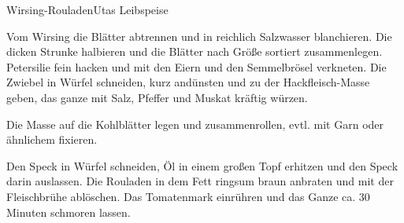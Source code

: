\begin{recipe}{Wirsing-Rouladen}{Utas Leibspeise}
  \label{Wirsing-Rouladen}
  \inglist


  \steps
  Vom Wirsing die Blätter abtrennen und in reichlich Salzwasser blanchieren. Die dicken
  Strunke halbieren und die Blätter nach Größe sortiert zusammenlegen. Petersilie fein
  hacken und mit den Eiern und den Semmelbrösel verkneten. Die Zwiebel in Würfel
  schneiden, kurz andünsten und zu der Hackfleisch-Masse geben, das ganze mit Salz, Pfeffer
  und Muskat kräftig würzen.

  Die Masse auf die Kohlblätter legen und zusammenrollen, evtl. mit Garn oder ähnlichem
  fixieren.

  Den Speck in Würfel schneiden, Öl in einem großen Topf erhitzen und den Speck darin
  auslassen. Die Rouladen in dem Fett ringsum braun anbraten und mit der Fleischbrühe
  ablöschen. Das Tomatenmark einrühren und das Ganze ca. 30 Minuten schmoren lassen.

\end{recipe}
